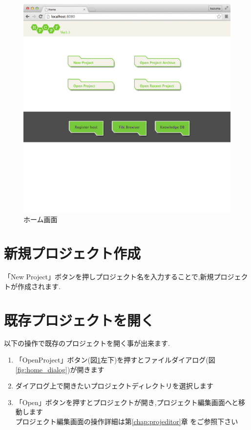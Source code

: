 \documentclass[a4paper,10pt,oneside]{jsbook}
\begin{document}
\begin{figure}[htbp]
	\begin{center}
		\includegraphics[width=11.5cm]{image/home_000.png}
	\end{center}
	\caption{ホーム画面}
	\label{fig:home}
\end{figure}


\section{新規プロジェクト作成}
「New Project」ボタンを押しプロジェクト名を入力することで,新規プロジェクトが作成されます.

\section{既存プロジェクトを開く}
以下の操作で既存のプロジェクトを開く事が出来ます.
\begin{enumerate}
	\item 「OpenProject」ボタン(図\ref{fig:home}左下)を押すとファイルダイアログ(図\ref{fig:home_dialog})が開きます
	\item ダイアログ上で開きたいプロジェクトディレクトリを選択します
	\item 「Open」ボタンを押すとプロジェクトが開き,プロジェクト編集画面へと移動します\\
			プロジェクト編集画面の操作詳細は第\ref{chap:projeditor}章 をご参照下さい
\end{enumerate}
\end{document}
